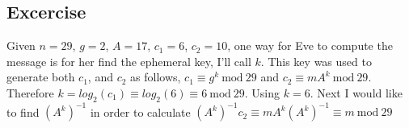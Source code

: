 \documentclass{article}
\begin{document}
\subsection{Excercise}
Given $n = 29$, $g = 2$, $A = 17$, $c_1 = 6$, $c_2 = 10$, one way for Eve to compute the message is for her find the ephemeral key, I'll call $k$. This key was used to generate both $c_1$, and $c_2$ as follows, $c_1 \equiv g^{k}\ \textrm{mod}\ 29$ and $c_2 \equiv mA^{k}\ \textrm{mod}\ 29$. Therefore $k = log_2(c_1) \equiv log_2(6)\equiv 6\ \textrm{mod}\ 29$. Using $k = 6$. Next I would like to find $(A^{k})^{-1}$ in order to calculate $(A^{k})^{-1}c_2 \equiv mA^k(A^{k})^{-1} \equiv m\ \textrm{mod}\ 29$
\end{document}
